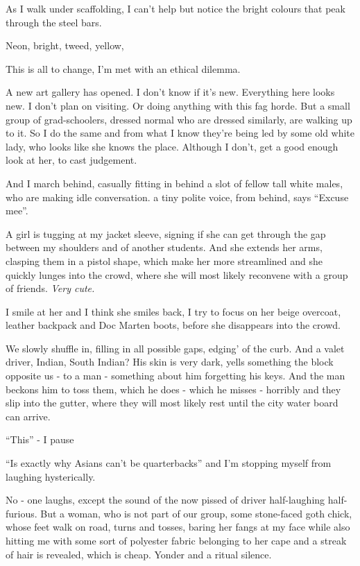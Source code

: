 \documentclass[19pt,openany]{book}
\begin{document}
As I walk under scaffolding,
I can't help but notice
the bright colours that
peak through the steel bars.

Neon, bright, tweed, yellow,


This is all to change, I'm
met with an ethical dilemma.


A new art gallery has opened. I don't know if it's
new. Everything here looks new.
I don't plan on visiting. Or doing anything
with this fag horde. But a small group of grad-schoolers,
dressed normal
who are dressed
similarly, are walking up to it. So I do
the same and from what I know they're being led by
some old white lady, who looks like she
knows the place. Although I don't, get a good enough look at her,
to cast judgement.

And I march behind, casually fitting in behind a slot
of fellow tall white males, who are making idle conversation.
a tiny polite voice, from behind, says ``Excuse mee''.

A girl is tugging at my jacket sleeve,
signing if she can get through the gap between my shoulders
and of another students. And she extends
her arms, clasping them in a pistol shape,
which make her more streamlined and
she quickly lunges into the crowd, where
she will most likely reconvene with a group of friends.
\textit{Very cute.}

I smile at her and I think she smiles back, I try to focus
on her beige overcoat, leather backpack and Doc Marten boots,
before she disappears into the crowd.

We slowly shuffle in, filling in all possible gaps, edging'
of the curb. And a valet driver, Indian, South Indian?
His skin is very dark, yells something the block opposite
us - to a man - something about him forgetting his keys.
And the man beckons him to toss them, which he does -
which he misses - horribly and they slip into the gutter,
where they will most likely rest until the city water board
can arrive.

``This'' - I pause

``Is exactly why Asians can't be quarterbacks'' and I'm
stopping myself from laughing hysterically.

No - one laughs, except the sound of the now
pissed of driver half-laughing half-furious. But a woman,
who is not part of our group,
some stone-faced goth chick, whose feet walk
on road, turns and tosses, baring
her fangs at my face while also hitting me with some
sort of polyester fabric belonging to her
cape and a streak of hair is revealed,
which is cheap. Yonder and a ritual silence.
\end{document}

